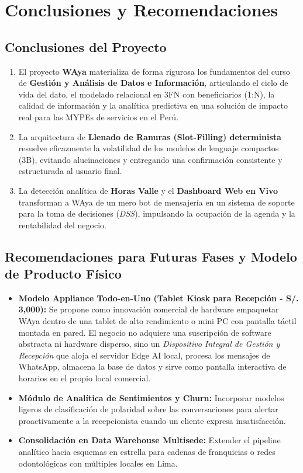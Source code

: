 \documentclass[12pt,a4paper]{report}
\begin{document}
\chapter{Conclusiones y Recomendaciones}

\section{Conclusiones del Proyecto}
\begin{enumerate}[leftmargin=1.5em]
    \item El proyecto \textbf{WAya} materializa de forma rigurosa los fundamentos del curso de \textbf{Gestión y Análisis de Datos e Información}, articulando el ciclo de vida del dato, el modelado relacional en 3FN con beneficiarios (1:N), la calidad de información y la analítica predictiva en una solución de impacto real para las MYPEs de servicios en el Perú.
    \item La arquitectura de \textbf{Llenado de Ranuras (Slot-Filling) determinista} resuelve eficazmente la volatilidad de los modelos de lenguaje compactos (3B), evitando alucinaciones y entregando una confirmación consistente y estructurada al usuario final.
    \item La detección analítica de \textbf{Horas Valle} y el \textbf{Dashboard Web en Vivo} transforman a WAya de un mero bot de mensajería en un sistema de soporte para la toma de decisiones (\textit{DSS}), impulsando la ocupación de la agenda y la rentabilidad del negocio.
\end{enumerate}

\section{Recomendaciones para Futuras Fases y Modelo de Producto Físico}
\begin{itemize}[leftmargin=1.5em]
    \item \textbf{Modelo Appliance Todo-en-Uno (Tablet Kiosk para Recepción - S/. 3,000):} Se propone como innovación comercial de hardware empaquetar WAya dentro de una tablet de alto rendimiento o mini PC con pantalla táctil montada en pared. El negocio no adquiere una suscripción de software abstracta ni hardware disperso, sino un \textit{Dispositivo Integral de Gestión y Recepción} que aloja el servidor Edge AI local, procesa los mensajes de WhatsApp, almacena la base de datos y sirve como pantalla interactiva de horarios en el propio local comercial.
    \item \textbf{Módulo de Analítica de Sentimientos y Churn:} Incorporar modelos ligeros de clasificación de polaridad sobre las conversaciones para alertar proactivamente a la recepcionista cuando un cliente expresa insatisfacción.
    \item \textbf{Consolidación en Data Warehouse Multisede:} Extender el pipeline analítico hacia esquemas en estrella para cadenas de franquicias o redes odontológicas con múltiples locales en Lima.
\end{itemize}

\end{document}
